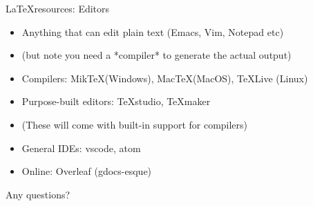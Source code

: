 \documentclass{beamer}
\begin{document}
\begin{frame}{\LaTeX resources: Editors}
\begin{itemize}
	\item Anything that can edit plain text (Emacs, Vim, Notepad etc)
	\item (but note you need a *compiler* to generate the actual output)
	\item Compilers: Mik\TeX (Windows), Mac\TeX (MacOS), \TeX Live (Linux)
	\pause
	\item Purpose-built editors: \TeX{studio}, \TeX{maker}
	\item (These will come with built-in support for compilers)
	\pause
	\item General IDEs: vscode, atom
	\pause
	\item Online: Overleaf (gdocs-esque)
\end{itemize}

\end{frame}

\begin{frame}
	Any questions?
\end{frame}
\end{document}
